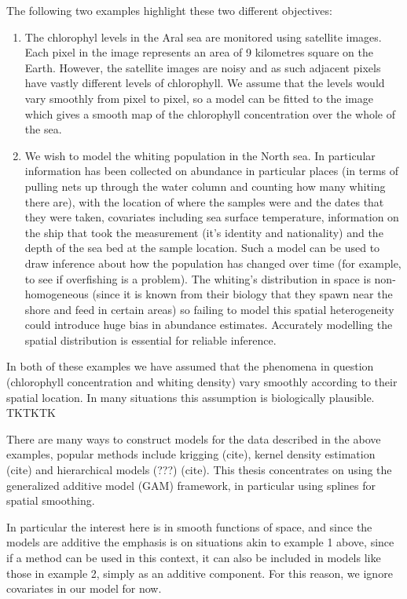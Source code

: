 The following two examples highlight these two different objectives:
\begin{enumerate}
\item The chlorophyl levels in the Aral sea are monitored using satellite images. Each pixel in the image represents an area of 9 kilometres square on the Earth. However, the satellite images are noisy and as such adjacent pixels have vastly different levels of chlorophyll. We assume that the levels would vary smoothly from pixel to pixel, so a model can be fitted to the image which gives a smooth map of the chlorophyll concentration over the whole of the sea.
\item We wish to model the whiting population in the North sea. In particular information has been collected on abundance in particular places (in terms of pulling nets up through the water column and counting how many whiting there are), with the location of where the samples were and the dates that they were taken, covariates including sea surface temperature, information on the ship that took the measurement (it's identity and nationality) and the depth of the sea bed at the sample location. Such a model can be used to draw inference about how the population has changed over time (for example, to see if overfishing is a problem). The whiting's distribution in space is non-homogeneous (since it is known from their biology that they spawn near the shore and feed in certain areas) so failing to model this spatial heterogeneity could introduce huge bias in abundance estimates. Accurately modelling the spatial distribution is essential for reliable inference.
\end{enumerate}
In both of these examples we have assumed that the phenomena in question (chlorophyll concentration and whiting density) vary smoothly according to their spatial location. In many situations this assumption is biologically plausible. TKTKTK

There are many ways to construct models for the data described in the above examples, popular methods include krigging (cite), kernel density estimation (cite) and hierarchical models (???) (cite). This thesis concentrates on using the generalized additive model (GAM) framework, in particular using splines for spatial smoothing.

In particular the interest here is in smooth functions of space, and since the models are additive the emphasis is on situations akin to example 1 above, since if a method can be used in this context, it can also be included in models like those in example 2, simply as an additive component. For this reason, we ignore covariates in our model for now.

